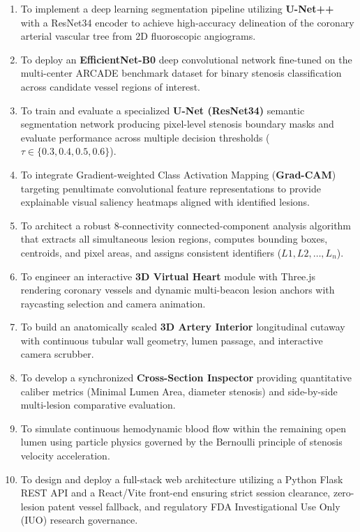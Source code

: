 \begin{enumerate}
    \item To implement a deep learning segmentation pipeline utilizing \textbf{U-Net++} with a ResNet34 encoder to achieve high-accuracy delineation of the coronary arterial vascular tree from 2D fluoroscopic angiograms.
    \item To deploy an \textbf{EfficientNet-B0} deep convolutional network fine-tuned on the multi-center ARCADE benchmark dataset for binary stenosis classification across candidate vessel regions of interest.
    \item To train and evaluate a specialized \textbf{U-Net (ResNet34)} semantic segmentation network producing pixel-level stenosis boundary masks and evaluate performance across multiple decision thresholds ($\tau \in \{0.3, 0.4, 0.5, 0.6\}$).
    \item To integrate Gradient-weighted Class Activation Mapping (\textbf{Grad-CAM}) targeting penultimate convolutional feature representations to provide explainable visual saliency heatmaps aligned with identified lesions.
    \item To architect a robust 8-connectivity connected-component analysis algorithm that extracts all simultaneous lesion regions, computes bounding boxes, centroids, and pixel areas, and assigns consistent identifiers ($L1, L2, \dots, L_n$).
    \item To engineer an interactive \textbf{3D Virtual Heart} module with Three.js rendering coronary vessels and dynamic multi-beacon lesion anchors with raycasting selection and camera animation.
    \item To build an anatomically scaled \textbf{3D Artery Interior} longitudinal cutaway with continuous tubular wall geometry, lumen passage, and interactive camera scrubber.
    \item To develop a synchronized \textbf{Cross-Section Inspector} providing quantitative caliber metrics (Minimal Lumen Area, diameter stenosis) and side-by-side multi-lesion comparative evaluation.
    \item To simulate continuous hemodynamic blood flow within the remaining open lumen using particle physics governed by the Bernoulli principle of stenosis velocity acceleration.
    \item To design and deploy a full-stack web architecture utilizing a Python Flask REST API and a React/Vite front-end ensuring strict session clearance, zero-lesion patent vessel fallback, and regulatory FDA Investigational Use Only (IUO) research governance.
\end{enumerate}

